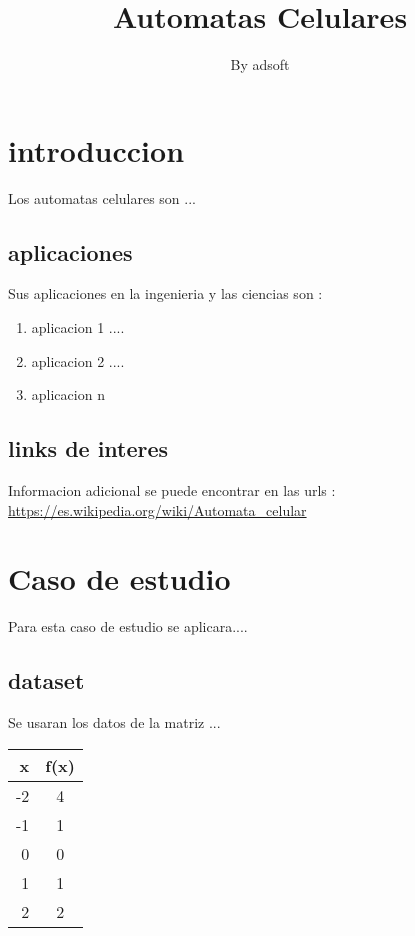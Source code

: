 \documentclass[a4paper,12pt]{article}
\begin{document}
\title{Automatas Celulares}
\author{By adsoft}
\maketitle


\tableofcontents
\newpage
{}


\section{introduccion}
 Los automatas celulares son ...

 \subsection{aplicaciones}
   Sus aplicaciones en la ingenieria y las ciencias son :
  \begin{enumerate}

   \item{aplicacion 1 ....}
   \item{aplicacion 2 ....}
   \item{aplicacion n }


  \end{enumerate}

 \subsection{links de interes}
   Informacion adicional se puede encontrar en las urls :
   \url{https://es.wikipedia.org/wiki/Automata_celular}

\section{Caso de estudio}
   Para esta caso de estudio se aplicara....

 \subsection{dataset}
  Se usaran los datos de la matriz ...

 \begin{tabular}{rc}
  x & f(x)  \\
  \hline
  -2 & 4 \\
  -1 & 1 \\
  0 & 0 \\
  1 & 1 \\
  2 & 2 \\
 \end{tabular}
\end{document}

